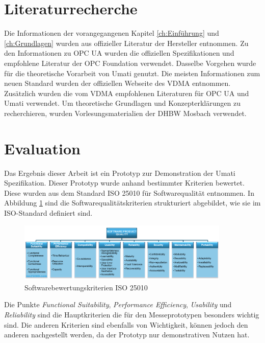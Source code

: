 \documentclass[a4paper, 12pt, oneside, toc=listofnumbered, bibliography=totoc]{scrbook}
\begin{document}
	\section{Literaturrecherche}
	
	Die Informationen der vorangegangenen Kapitel \ref{ch:Einführung} und \ref{ch:Grundlagen} wurden aus offizieller Literatur der Hersteller entnommen. Zu den Informationen zu OPC UA wurden die offiziellen Spezifikationen und empfohlene Literatur der OPC Foundation verwendet. Dasselbe Vorgehen wurde für die theoretische Vorarbeit von \ac{Umati} genutzt. Die meisten Informationen zum neuen Standard wurden der offiziellen Webseite des VDMA entnommen. Zusätzlich wurden die vom VDMA empfohlenen Literaturen für OPC UA und Umati verwendet. Um theoretische Grundlagen und Konzepterklärungen zu recherchieren, wurden Vorlesungsmaterialien der DHBW Mosbach verwendet.
	
	
	
	\section{Evaluation}
	
	
	Das Ergebnis dieser Arbeit ist ein Prototyp zur Demonstration der \ac{Umati} Spezifikation. Dieser Prototyp wurde anhand bestimmter Kriterien bewertet. Diese wurden aus dem Standard ISO 25010 für Softwarequalität entnommen. In Abbildung \ref{fig:ISO25010} sind die Softwarequalitätskriterien strukturiert abgebildet, wie sie im ISO-Standard definiert sind. 
	
	\begin{figure}[H]
		\centering
		\includegraphics[width=0.9\textwidth]{res/diagramms/iso25010.png}
		\caption{Softwarebewertungskriterien ISO 25010} 
		\label{fig:ISO25010}
	\end{figure}
	
	
	
	Die Punkte \textit{Functional Suitability}, \textit{Performance Efficiency}, \textit{Usability} und \textit{Reliability} sind die Hauptkriterien die für den Messeprototypen besonders wichtig sind. Die anderen Kriterien sind ebenfalls von Wichtigkeit, können jedoch den anderen nachgestellt werden, da der Prototyp nur demonstrativen Nutzen hat. 
	
\end{document}
